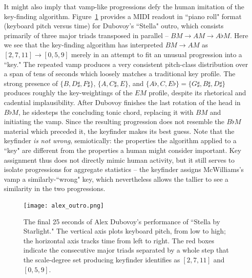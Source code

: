 \begin{enumerate}
It might also imply that vamp-like progressions defy the human imitation of the key-finding algorithm.  Figure~\ref{alex_outro} provides a MIDI readout in ``piano roll" format (keyboard pitch versus time) for Dubovoy's ``Stella" outro, which consists primarily of three major triads transposed in parallel -- $BM \rightarrow AM \rightarrow A\flat M$.  Here we see that the key-finding algorithm has interpreted $BM \rightarrow AM$ as $[2,7,11] \rightarrow [0,5,9]$ merely in an attempt to fit an unusual progression into a ``key."  The repeated vamp produces a very consistent pitch-class distribution over a span of tens of seconds which loosely matches a traditional key profile.  The strong presence of $\{B,D\sharp,F\sharp\}$, $\{A,C\sharp,E\}$, and $\{A\flat,C,E\flat\}=\{G\sharp,B\sharp,D\sharp\}$ produces roughly the key-weightings of the $EM$ profile, despite its rhetorical and cadential implausibility.  After Dubovoy finishes the last rotation of the head in $B\flat M$, he sidesteps the concluding tonic chord, replacing it with $BM$ and initiating the vamp.  Since the resulting progression does not resemble the $B\flat M$ material which preceded it, the keyfinder makes its best guess.  Note that the keyfinder \emph{is not wrong}, semiotically: the properties the algorithm applied to a ``key" are different from the properties a human might consider important.  Key assignment thus does not directly mimic human activity, but it still serves to isolate progressions for aggregate statistics -- the keyfinder assigns McWilliams's vamp a similarly-``wrong" key, which nevertheless allows the tallier to see a similarity in the two progressions.
	\begin{landscape}
	\begin{figure}
		\centering
		\caption{The final 25 seconds of Alex Dubovoy's performance of ``Stella by Starlight."  The vertical axis plots keyboard pitch, from low to high; the horizontal axis tracks time from left to right.  The red boxes indicate the consecutive major triads separated by a whole step that the scale-degree set producing keyfinder identifies as $[2,7,11]$ and $[0,5,9]$.}
		\label{alex_outro}
		\texttt{[image: alex\_outro.png]}
	\end{figure}
	\end{landscape}


\end{enumerate}
